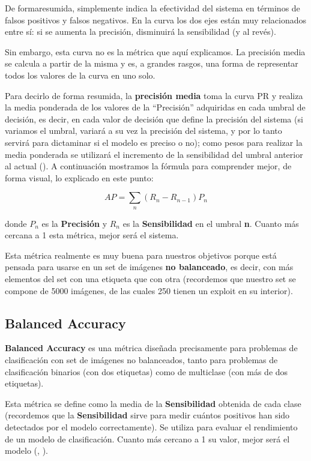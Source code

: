 De formaresumida, simplemente indica la efectividad del sistema en términos de falsos positivos y falsos negativos. En la curva los dos ejes están muy relacionados entre sí: si se aumenta la precisión, disminuirá la sensibilidad (y al revés).

Sin embargo, esta curva no es la métrica que aquí explicamos. La precisión media se calcula a partir de la misma y es, a grandes rasgos, una forma de representar todos los valores de la curva en uno solo.

Para decirlo de forma resumida, la \textbf{precisión media} toma la curva \ac{PR} y realiza la media ponderada de los valores de la ``Precisión'' adquiridas en cada umbral de decisión, es decir, en cada valor de decisión que define la precisión del sistema (si variamos el umbral, variará a su vez la precisión del sistema, y por lo tanto servirá para dictaminar si el modelo es preciso o no); como pesos para realizar la media ponderada se utilizará el incremento de la sensibilidad del umbral anterior al actual (\cite{apscore}). A continuación mostramos la fórmula para comprender mejor, de forma visual, lo explicado en este punto: %

\begin{equation}\label{eq:apscore}
AP = \sum_{n}(R_n - R_{n-1})P_n
\end{equation}

donde $P_n$ es la \textbf{Precisión} y $R_n$ es la \textbf{Sensibilidad} en el umbral \textbf{n}. Cuanto más cercana a 1 esta métrica, mejor será el sistema.

Esta métrica realmente es muy buena para nuestros objetivos porque está pensada para usarse en un set de imágenes \textbf{no balanceado}, es decir, con más elementos del set con una etiqueta que con otra (recordemos que nuestro set se compone de 5000 imágenes, de las cuales 250 tienen un exploit en su interior).

\subsection{Balanced Accuracy}

\textbf{Balanced Accuracy} es una métrica diseñada precisamente para problemas de clasificación con set de imágenes no balanceados, tanto para problemas de clasificación binarios (con dos etiquetas) como de multiclase (con más de dos etiquetas).

Esta métrica se define como la media de la \textbf{Sensibilidad} obtenida de cada clase (recordemos que la \textbf{Sensibilidad} sirve para medir cuántos positivos han sido detectados por el modelo correctamente). Se utiliza para evaluar el rendimiento de un modelo de clasificación. Cuanto más cercano a 1 su valor, mejor será el modelo (\cite{balanced-accuracy}, \cite{balanced-accuracy-2}). %

